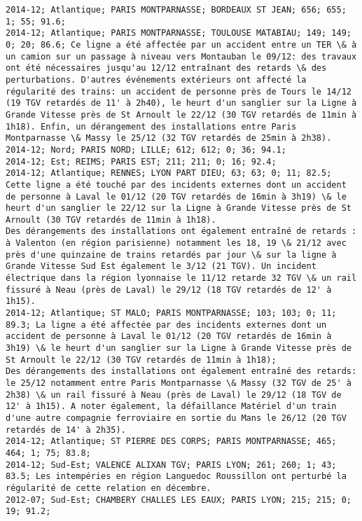 \documentclass{article}
\begin{document}
\begin{Verbatim}[commandchars=\\\{\}]
2014-12; Atlantique; PARIS MONTPARNASSE; BORDEAUX ST JEAN; 656; 655; 1; 55; 91.6; 
2014-12; Atlantique; PARIS MONTPARNASSE; TOULOUSE MATABIAU; 149; 149; 0; 20; 86.6; Ce ligne a été affectée par un accident entre un TER \& à un camion sur un passage à niveau vers Montauban le 09/12: des travaux ont été nécessaires jusqu'au 12/12 entraînant des retards \& des perturbations. D'autres événements extérieurs ont affecté la régularité des trains: un accident de personne près de Tours le 14/12 (19 TGV retardés de 11' à 2h40), le heurt d'un sanglier sur la Ligne à Grande Vitesse près de St Arnoult le 22/12 (30 TGV retardés de 11min à 1h18). Enfin, un dérangement des installations entre Paris Montparnasse \& Massy le 25/12 (32 TGV retardés de 25min à 2h38).
2014-12; Nord; PARIS NORD; LILLE; 612; 612; 0; 36; 94.1; 
2014-12; Est; REIMS; PARIS EST; 211; 211; 0; 16; 92.4; 
2014-12; Atlantique; RENNES; LYON PART DIEU; 63; 63; 0; 11; 82.5; Cette ligne a été touché par des incidents externes dont un accident de personne à Laval le 01/12 (20 TGV retardés de 16min à 3h19) \& le heurt d'un sanglier le 22/12 sur la Ligne à Grande Vitesse près de St Arnoult (30 TGV retardés de 11min à 1h18).
Des dérangements des installations ont également entraîné de retards : à Valenton (en région parisienne) notamment les 18, 19 \& 21/12 avec près d'une quinzaine de trains retardés par jour \& sur la ligne à Grande Vitesse Sud Est également le 3/12 (21 TGV). Un incident électrique dans la région lyonnaise le 11/12 retarde 32 TGV \& un rail fissuré à Neau (près de Laval) le 29/12 (18 TGV retardés de 12' à 1h15).
2014-12; Atlantique; ST MALO; PARIS MONTPARNASSE; 103; 103; 0; 11; 89.3; La ligne a été affectée par des incidents externes dont un accident de personne à Laval le 01/12 (20 TGV retardés de 16min à 3h19) \& le heurt d'un sanglier sur la Ligne à Grande Vitesse près de St Arnoult le 22/12 (30 TGV retardés de 11min à 1h18);
Des dérangements des installations ont également entraîné des retards: le 25/12 notamment entre Paris Montparnasse \& Massy (32 TGV de 25' à 2h38) \& un rail fissuré à Neau (près de Laval) le 29/12 (18 TGV de 12' à 1h15). A noter également, la défaillance Matériel d'un train d'une autre compagnie ferroviaire en sortie du Mans le 26/12 (20 TGV retardés de 14' à 2h35).
2014-12; Atlantique; ST PIERRE DES CORPS; PARIS MONTPARNASSE; 465; 464; 1; 75; 83.8; 
2014-12; Sud-Est; VALENCE ALIXAN TGV; PARIS LYON; 261; 260; 1; 43; 83.5; Les intempéries en région Languedoc Roussillon ont perturbé la régularité de cette relation en décembre.
2012-07; Sud-Est; CHAMBERY CHALLES LES EAUX; PARIS LYON; 215; 215; 0; 19; 91.2; 

\end{Verbatim}
\end{document}

